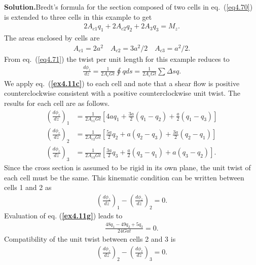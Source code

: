 \documentclass{AeroStructure-ERJohnson}
\begin{document}
\begin{example}
\noindent\textbf{Solution.}\enspace Bredt's formula for the section composed of two cells in eq.~(\ref{eq4.70}) is extended to three cells in this example to get
\begin{align}\label{ex4.11a}
2 A_{c 1} q_{1}+2 A_{c 2} q_{2}+2 A_{3} q_{3}=M_{z}.
\end{align}
The areas enclosed by cells are
\begin{align}\label{ex4.11b}
A_{c 1}=2 a^{2} \quad A_{c 2}=3 a^{2}/2 \quad A_{c 3}=a^{2}/2.
\end{align}
From eq.~(\ref{eq4.71}) the twist per unit length for this example reduces to
\begin{align}\label{ex4.11c}
\frac{d \phi_{z}}{d z}=\frac{1}{2 A_{c} G t} \oint\! q d s=\frac{1}{2 A_{c} G t} \sum \Delta s q.
\end{align}
We apply eq.~(\textbf{\ref{ex4.11c}}) to each cell and note that a shear flow is positive counterclockwise consistent with a positive counterclockwise unit twist. The results for each cell are as follows.
\begin{align}
\left(\frac{d \phi_{z}}{d z}\right)_{1} &=\frac{1}{2 A_{c 1} G t}\left[4 a q_{1}+\frac{3 a}{2}\left(q_{1}-q_{2}\right)+\frac{a}{2}\left(q_{1}-q_{3}\right)\right]
\label{ex4.11d}\\
\left(\frac{d \phi_{z}}{d z}\right)_{2} &=\frac{1}{2 A_{c 2} G t}\left[\frac{5 a}{2} q_{2}+a\left(q_{2}-q_{3}\right)+\frac{3a}{2}\left(q_{2}-q_{1}\right)\right]
\label{ex4.11e}\\
\left(\frac{d \phi_{z}}{d z}\right)_{3}&=\frac{1}{2 A_{c 3} G t}\left[\frac{3 a}{2} q_{3}+\frac{a}{2}\left(q_{3}-q_{1}\right)+a\left(q_{3}-q_{2}\right)\right].\label{ex4.11f}
\end{align}
Since the cross section is assumed to be rigid in its own plane, the unit twist of each cell must be the same. This kinematic condition can be written between cells 1 and 2 as
\begin{align}\label{ex4.11g}
\left(\frac{d \phi_{z}}{d z}\right)_{1}-\left(\frac{d \phi_{z}}{d z}\right)_{2}=0.
\end{align}
Evaluation of eq. (\textbf{\ref{ex4.11g}}) leads to
\begin{align}\label{ex4.11h}
\frac{48 q_{1}-49 q_{2}+5 q_{3}}{24 G a t}=0.
\end{align}
Compatibility of the unit twist between cells 2 and 3 is
\begin{align}\label{ex4.11i}
\left(\frac{d \phi_{z}}{d z}\right)_{2}-\left(\frac{d \phi_{z}}{d z}\right)_{3}=0.
\end{align}

\end{example}
\end{document}

